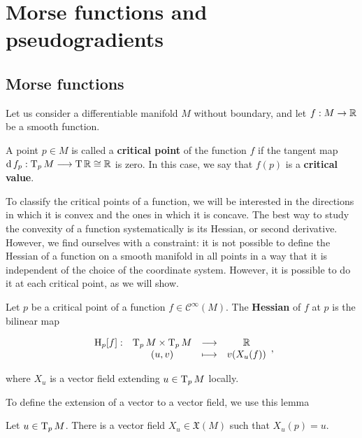 \section{Morse functions and pseudogradients}

\subsection{Morse functions}

Let us consider a differentiable manifold $M$ without boundary, and let $f : M \rightarrow \mathbb{R}$ be a smooth function.

\begin{deff}
	A point $p \in M$ is called a {\bf critical point} of the function $f$ if the tangent map $\operatorname d f_p : \operatorname T_pM \longrightarrow \operatorname T\mathbb{R} \cong \mathbb{R}$ is zero. In this case, we say that $f(p)$ is a {\bf critical value}.
\end{deff}

To classify the critical points of a function, we will be interested in the directions in which it is convex and the ones in which it is concave. The best way to study the convexity of a function systematically is its Hessian, or second derivative. However, we find ourselves with a constraint: it is not possible to define the Hessian of a function on a smooth manifold in all points in a way that it is independent of the choice of the coordinate system. However, it is possible to do it at each critical point, as we will show.

\begin{deff}
	Let $p$ be a critical point of a function $f \in \mathcal{C}^{\infty}(M)$. The {\bf Hessian} of $f$ at $p$ is the bilinear map

\begin{displaymath}
	\begin{array}{rccc} \operatorname H_p[f] : & \operatorname T_pM \times \operatorname T_pM & \longrightarrow & \mathbb{R} \\ & (u,v) & \longmapsto & v(X_u(f)) \end{array} ,
\end{displaymath}

where $X_u$ is a vector field extending $u \in \operatorname T_pM$ locally.
\end{deff}

To define the extension of a vector to a vector field, we use this lemma

\begin{lema}
	Let $u \in \operatorname T_pM$. There is a vector field $X_u \in \mathfrak{X}(M)$ such that $X_u(p) = u$.
\end{lema}

